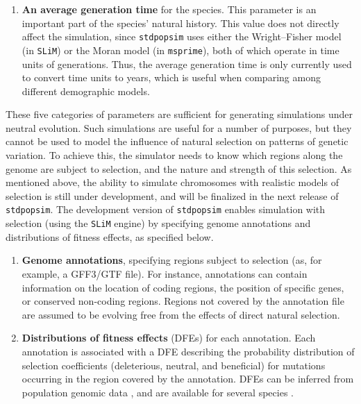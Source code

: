 \documentclass[hidelinks]{article}
\newcommand{\stdpopsim}{\texttt{stdpopsim}\xspace}
\begin{document}
\begin{enumerate}
\item
  \textbf{An average generation time} for the species.
  This parameter is an important part of the species' natural history.
  This value does not directly affect the simulation, since
  \stdpopsim uses either the Wright--Fisher model (in \texttt{SLiM}) or the Moran model (in \texttt{msprime}),
  both of which operate in time units of generations. 
  Thus, the average generation time is only currently used to convert time units to years, 
  which is useful when comparing among different demographic models.

\end{enumerate}


These five categories of parameters are sufficient for generating simulations
under neutral evolution. Such simulations are useful for a number of purposes,
but they cannot be used to model the influence of natural selection on patterns of genetic variation.
To achieve this, the simulator needs to know which regions along the genome are subject to selection,
and the nature and strength of this selection.
As mentioned above, the ability to simulate chromosomes with realistic models of
selection is still under development, and will be finalized in the next release of \stdpopsim.
The development version of \stdpopsim enables simulation with selection
(using the \texttt{SLiM} engine)
by specifying genome annotations and distributions of fitness effects,
as specified below.


\begin{enumerate}
	\def\labelenumi{\arabic{enumi}.}
	\setcounter{enumi}{5}
	\item
	\textbf{Genome annotations}, specifying regions subject to selection (as, for example, a GFF3/GTF file).
    For instance, annotations can contain information on the location of coding regions,
    the position of specific genes, or conserved non-coding regions.
    Regions not covered by the annotation file are assumed to be evolving free from the effects of direct natural selection.

	\item
	\textbf{Distributions of fitness effects} (DFEs) for each annotation.
    Each annotation is associated with a DFE describing
    the probability distribution of selection coefficients (deleterious, neutral, and beneficial)
    for mutations occurring in the region covered by the annotation.
    DFEs can be inferred from population genomic data \citep[reviewed in][]{Eyre-Walker2007},
    and are available for several species \citep[e.g.,][]{Ma2013, Huber2018}.
\end{enumerate}
\end{document}
